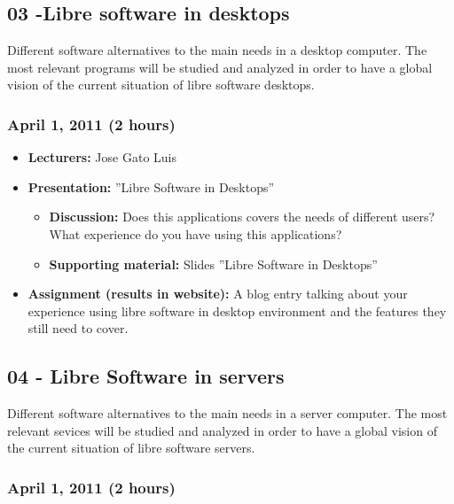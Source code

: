 \documentclass[a4paper]{article}
\begin{document}
\subsection{03 -Libre software in desktops}

Different software alternatives to the main needs in a desktop computer. The most relevant programs will be studied and analyzed in order to have a global vision of the current situation of libre software desktops. 

\subsubsection{April 1, 2011 (2 hours)}

\begin{itemize}
\item \textbf{Lecturers:} Jose Gato Luis
\item \textbf{Presentation:} ''Libre Software in Desktops''
  \begin{itemize}
  \item \textbf{Discussion:} Does this applications covers the needs of different users? What experience do you have using this applications?
  \item \textbf{Supporting material:} Slides ''Libre Software in Desktops''
  \end{itemize}
\item \textbf{Assignment (results in website):} A blog entry talking about your experience using libre software in desktop environment and the features they still need to cover. 
\end{itemize}

\subsection{04 - Libre Software in servers}

Different software alternatives to the main needs in a server computer. The most relevant sevices will be studied and analyzed in order to have a global vision of the current situation of libre software servers. 

\subsubsection{April 1, 2011 (2 hours)}
\end{document}
